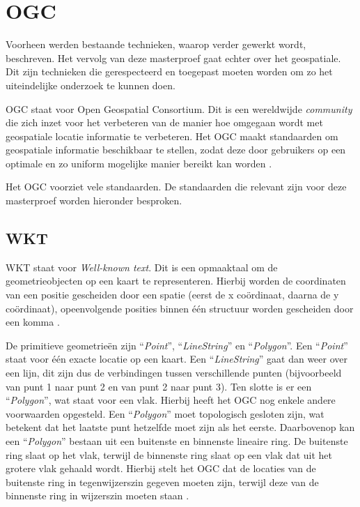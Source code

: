 \section{OGC}
\label{sec:ogc}

Voorheen werden bestaande technieken, waarop verder gewerkt wordt, beschreven. Het vervolg van deze masterproef gaat echter over het geospatiale. Dit zijn technieken die gerespecteerd en toegepast moeten worden om zo het uiteindelijke onderzoek te kunnen doen. 

OGC staat voor Open Geospatial Consortium. Dit is een wereldwijde \textit{community} die zich inzet voor het verbeteren van de manier hoe omgegaan wordt met geospatiale locatie informatie te verbeteren. Het OGC maakt standaarden om geospatiale informatie beschikbaar te stellen, zodat deze door gebruikers op een optimale en zo uniform mogelijke manier bereikt kan worden \cite{ogcdocs}.

Het OGC voorziet vele standaarden. De standaarden die relevant zijn voor deze masterproef worden hieronder besproken.

\subsection{WKT}
WKT staat voor \textit{Well-known text}. Dit is een opmaaktaal om de geometrieobjecten op een kaart te representeren. Hierbij worden de coordinaten van een positie gescheiden door een spatie (eerst de x coördinaat, daarna de y coördinaat), opeenvolgende posities binnen één structuur worden gescheiden door een komma \cite{ogcdocs}. 

De primitieve geometrieën zijn ``\textit{Point}'', ``\textit{LineString}'' en ``\textit{Polygon}''. Een ``\textit{Point}'' staat voor één exacte locatie op een kaart. Een ``\textit{LineString}'' gaat dan weer over een lijn, dit zijn dus de verbindingen tussen verschillende punten (bijvoorbeeld van punt 1 naar punt 2 en van punt 2 naar punt 3). Ten slotte is er een ``\textit{Polygon}'', wat staat voor een vlak. Hierbij heeft het OGC nog enkele andere voorwaarden opgesteld. Een ``\textit{Polygon}'' moet topologisch gesloten zijn, wat betekent dat het laatste punt hetzelfde moet zijn als het eerste. Daarbovenop kan een ``\textit{Polygon}'' bestaan uit een buitenste en binnenste lineaire ring. De buitenste ring slaat op het vlak, terwijl de binnenste ring slaat op een vlak dat uit het grotere vlak gehaald wordt. Hierbij stelt het OGC dat de locaties van de buitenste ring in tegenwijzerszin gegeven moeten zijn, terwijl deze van de binnenste ring in wijzerszin moeten staan \cite{ogcdocs}.

